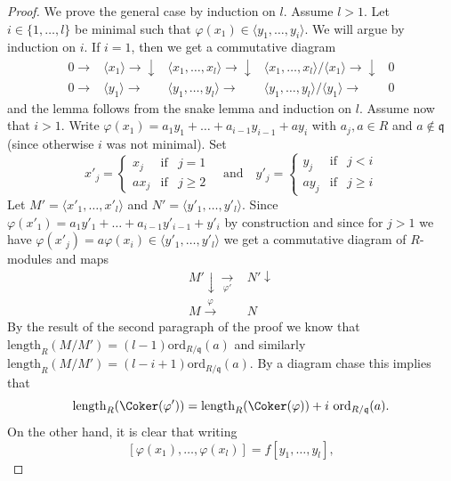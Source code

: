 \begin{proof}
\medskip\noindent
We prove the general case by induction on $l$. Assume $l > 1$.
Let $i \in \{1, \ldots, l\}$ be minimal such that
$\varphi(x_1) \in \langle y_1, \ldots, y_i\rangle$.
We will argue by induction on $i$.
If $i = 1$, then we get a commutative diagram
$$
\begin{array}{ccccc}0 \longrightarrow & \langle x_1 \rangle \longrightarrow\downarrow & \langle x_1, \ldots, x_l \rangle \longrightarrow\downarrow & \langle x_1, \ldots, x_l \rangle / \langle x_1 \rangle \longrightarrow\downarrow & 0 \\ 0 \longrightarrow & \langle y_1 \rangle \longrightarrow & \langle y_1, \ldots, y_l \rangle \longrightarrow & \langle y_1, \ldots, y_l \rangle / \langle y_1 \rangle \longrightarrow & 0\end{array}
$$
and the lemma follows from the snake lemma and induction on $l$.
Assume now that $i > 1$.
Write $\varphi(x_1) = a_1 y_1 + \ldots + a_{i - 1} y_{i - 1} + a y_i$
with $a_j, a \in R$ and $a \not \in \mathfrak q$ (since otherwise
$i$ was not minimal). Set
$$
x'_j =
\left\{
\begin{matrix}
x_j & \text{if} & j = 1 \\
ax_j & \text{if} & j \geq 2
\end{matrix}
\right.
\quad\text{and}\quad
y'_j =
\left\{
\begin{matrix}
y_j & \text{if} & j < i \\
ay_j & \text{if} & j \geq i
\end{matrix}
\right.
$$
Let $M' = \langle x'_1, \ldots, x'_l \rangle$ and
$N' = \langle y'_1, \ldots, y'_l \rangle$.
Since $\varphi(x'_1) = a_1 y'_1 + \ldots + a_{i - 1} y'_{i - 1} + y'_i$
by construction and since for $j > 1$ we have
$\varphi(x'_j) = a\varphi(x_i) \in \langle y'_1, \ldots, y'_l\rangle$
we get a commutative diagram of $R$-modules and maps
$$
\begin{array}{cc}M' \downarrow\underset{\varphi'}{\longrightarrow} & N' \downarrow \\ M \overset{\varphi}{\longrightarrow} & N\end{array}
$$
By the result of the second paragraph of the proof we know
that $\text{length}_R(M/M') = (l - 1)\text{ord}_{R/\mathfrak q}(a)$
and similarly
$\text{length}_R(M/M') = (l - i + 1)\text{ord}_{R/\mathfrak q}(a)$.
By a diagram chase this implies that
$$
\text{length}_R(\Coker(\varphi')) =
\text{length}_R(\Coker(\varphi)) + i\ \text{ord}_{R/\mathfrak q}(a).
$$
On the other hand, it is clear that writing
$$
[\varphi(x_1), \ldots, \varphi(x_l)] = f [y_1, \ldots, y_l],
$$
\end{proof}
